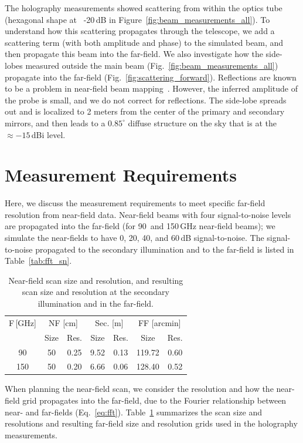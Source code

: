 The holography measurements showed scattering from within the optics tube (hexagonal shape at ~-20\,dB in Figure~\ref{fig:beam_measurements_all}).  To understand how this scattering propagates through the telescope, we add a scattering term (with both amplitude and phase) to the simulated beam, and then propagate this beam into the far-field.  We also investigate how the side-lobes measured outside the main beam (Fig.~\ref{fig:beam_measurements_all}) propagate into the far-field (Fig.~\ref{fig:scattering_forward}).  Reflections are known to be a problem in near-field beam mapping~\cite{2020JLTP..199..156Y,7740846,387181}.  However, the inferred amplitude of the probe is small, and we do not correct for reflections.  The side-lobe spreads out and is localized to 2 meters from the center of the primary and secondary mirrors, and then leads to a $0.85^{\circ}$ diffuse structure on the sky that is at the $\approx -15$\,dBi level.
\section{Measurement Requirements}
\label{sec:err_prop}
Here, we discuss the measurement requirements to meet specific far-field resolution from near-field data.  Near-field beams with four signal-to-noise levels are propagated into the far-field (for 90\, and 150\,GHz near-field beams); we simulate the near-fields to have 0, 20, 40, and 60\,dB signal-to-noise.  The signal-to-noise propagated to the secondary illumination and to the far-field is listed in Table~\ref{tab:fft_sn}. 
\begin{table}[htb]
\centering
\begin{tabular}{|c|c|c|c|c|c|c|}
\hline
F\,[GHz] & \multicolumn{2}{c|}{NF [cm]}&\multicolumn{2}{c|}{Sec. [m]} & \multicolumn{2}{c|}{FF [arcmin]} \\
 & Size & Res. & Size & Res.& Size & Res.\\ \hline
 90 & 50& 0.25 & 9.52& 0.13& 119.72 & 0.60\\
 150 & 50& 0.20 &6.66 &0.06 &128.40&0.52\\
 \hline
\end{tabular}
\caption{Near-field scan size and resolution, and resulting scan size and resolution at the secondary illumination and in the far-field.}
\label{tab:fft_grid}
\end{table}
When planning the near-field scan, we consider the resolution and how the near-field grid propagates into the far-field, due to the Fourier relationship between near- and far-fields (Eq.~\ref{eq:fft}).  Table~\ref{tab:fft_grid} summarizes the scan size and resolutions and resulting far-field size and resolution grids used in the holography measurements.
